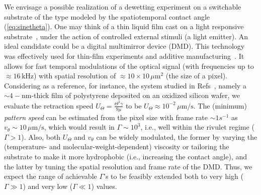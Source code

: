 We envisage a possible realization of a dewetting experiment on a switchable substrate of the type modeled by the spatiotemporal contact angle (\ref{eq:sinetheta}). 
One may think of a thin liquid film cast on a light responsive substrate~\cite{ichimuraLightDrivenMotionLiquids2000}, under the action of controlled external stimuli (a light emitter). 
An ideal candidate could be a digital multimirror device (DMD).
This technology was effectively used for thin-film experiments and additive manufacturing~\cite{vieyrasalasActiveControlEvaporative2012, sahaScalableSubmicrometerAdditive2019}. 
It allows for fast temporal modulations of the optical signal (with frequencies up to $\approx 16 \, \text{kHz}$) with spatial resolution of $\approx 10 \times 10 \, \mu \text{m}^2$ (the size of a pixel).
Considering as a reference, for instance, the system studied in Refs~\cite{beckerComplexDewettingScenarios2003,fetzerThermalNoiseInfluences2007}, namely a $\sim 4-\text{nm}$-thick film of polystyrene deposited on an oxidized silicon wafer, we evaluate the retraction speed $U_{\Theta} = \frac{\Theta^3 \gamma}{9 \mu}$ to be $U_{\Theta} \approx 10^{-2} \, \mu \text{m}/\text{s}$. 
The (minimum) \textit{pattern speed} can be estimated from the pixel size with frame rate $\sim 1 s^{-1}$ as $v_{\theta} \sim 10 \, \mu \text{m}/\text{s}$, which would result in $\Gamma \sim 10^3$, i.e., well within the rivulet regime ($\Gamma > 1$). 
Also, both $U_{\Theta}$ and $v_{\theta}$ can be widely modulated, the former by varying the (temperature- and molecular-weight-dependent) viscosity or tailoring the substrate to make it more hydrophobic (i.e., increasing the contact angle), and the latter by tuning the spatial resolution and frame rate of the DMD. 
Thus, we expect the range of achievable $\Gamma$'s to be feasibly extended both to very high ($\Gamma \gg 1$) and very low ($\Gamma \ll 1$) values.

